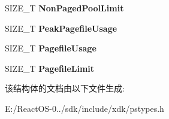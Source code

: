 \begin{DoxyCompactItemize}
S\+I\+Z\+E\+\_\+T {\bfseries Non\+Paged\+Pool\+Limit}
\item 
\mbox{\label{struct___p_o_o_l_e_d___u_s_a_g_e___a_n_d___l_i_m_i_t_s_a20d92929134424f6dd03a581d71cc754}} 
S\+I\+Z\+E\+\_\+T {\bfseries Peak\+Pagefile\+Usage}
\item 
\mbox{\label{struct___p_o_o_l_e_d___u_s_a_g_e___a_n_d___l_i_m_i_t_s_ace7e62a3da13b19c8a208c9c61564e0a}} 
S\+I\+Z\+E\+\_\+T {\bfseries Pagefile\+Usage}
\item 
\mbox{\label{struct___p_o_o_l_e_d___u_s_a_g_e___a_n_d___l_i_m_i_t_s_aa944bda7e287c57800632c1cb5545c0e}} 
S\+I\+Z\+E\+\_\+T {\bfseries Pagefile\+Limit}
\end{DoxyCompactItemize}


该结构体的文档由以下文件生成\+:\begin{DoxyCompactItemize}
\item 
E\+:/\+React\+O\+S-\/0../sdk/include/xdk/pstypes.\+h\end{DoxyCompactItemize}
